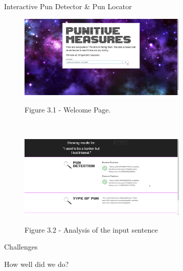 \documentclass[final]{beamer}
\newlength{\sepwid}
\newlength{\onecolwid}
\begin{document}
\begin{frame}[t]
\begin{columns}[t]
\begin{column}{\onecolwid}
\begin{block}{Interactive Pun Detector \& Pun Locator}
				\begin{figure}
				\centering
				\includegraphics[width=0.75\textwidth]{UI_1.jpg}\\
				\caption{Figure 3.1 - Welcome Page.}
				\end{figure}
				\\
				\vspace{20mm}
				\begin{figure}
				\centering
				\includegraphics[width=0.75\textwidth]{UI_2.png}\\
				\centering
				\caption{Figure 3.2 - Analysis of the input sentence}
				\end{figure}
			\end{block}
			\vspace{20mm}
            \begin{block}{Challenges}
            \end{block}
            \vspace{20mm}
            \begin{block}{How well did we do?}
            \end{block}
		\end{column}
		\begin{column}{\sepwid}\end{column}
	\end{columns}
\end{frame}
\end{document}
